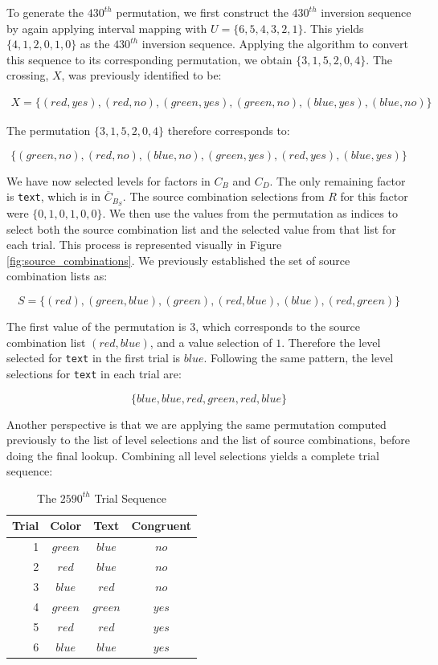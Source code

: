 To generate the $430^{th}$ permutation, we first construct the $430^{th}$ inversion sequence by again applying interval mapping with $U = \{6, 5, 4, 3, 2, 1\}$. This yields $\{4, 1, 2, 0, 1, 0\}$ as the $430^{th}$ inversion sequence. Applying the algorithm to convert this sequence to its corresponding permutation, we obtain $\{3, 1, 5, 2, 0, 4\}$. The crossing, $X$, was previously identified to be:

\begin{align*}
X = \{(red, yes), (red, no), (green, yes), (green, no), (blue, yes), (blue, no)\}
\end{align*}

The permutation $\{3, 1, 5, 2, 0, 4\}$ therefore corresponds to:

\[
    \{(green, no), (red, no), (blue, no), (green, yes), (red, yes), (blue, yes)\}
\]


We have now selected levels for factors in $C_B$ and $C_D$. The only remaining factor is \texttt{text}, which is in $\overline{C}_{B_S}$. The source combination selections from $R$ for this factor were $\{0, 1, 0, 1, 0, 0\}$. We then use the values from the permutation as indices to select both the source combination list and the selected value from that list for each trial. This process is represented visually in Figure \ref{fig:source_combinations}. We previously established the set of source combination lists as:

\[
S = \{(red), (green, blue), (green), (red, blue), (blue), (red, green)\}
\]

The first value of the permutation is $3$, which corresponds to the source combination list $(red, blue)$, and a value selection of $1$. Therefore the level selected for \texttt{text} in the first trial is $blue$. Following the same pattern, the level selections for \texttt{text} in each trial are:

\[
  \{blue, blue, red, green, red, blue\}
\]

Another perspective is that we are applying the same permutation computed previously to the list of level selections and the list of source combinations, before doing the final lookup. Combining all level selections yields a complete trial sequence:

\begin{table}[htb]
  \centering
  \caption{The $2590^{th}$ Trial Sequence}
\begin{tabular}{rccc}
\multicolumn{1}{c}{Trial} & Color   & Text    & Congruent \\ \hline
1                         & $green$ & $blue$  & $no$      \\
2                         & $red$   & $blue$  & $no$      \\
3                         & $blue$  & $red$   & $no$      \\
4                         & $green$ & $green$ & $yes$     \\
5                         & $red$   & $red$   & $yes$     \\
6                         & $blue$  & $blue$  & $yes$
\end{tabular}
\label{tab:example_trial_sequence}
\end{table}


